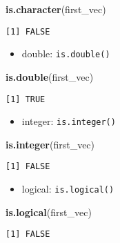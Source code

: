 \documentclass[
]{book}
\newenvironment{Shaded}{\begin{snugshade}}{\end{snugshade}}
\newcommand{\KeywordTok}[1]{\textcolor[rgb]{0.13,0.29,0.53}{\textbf{#1}}}
\newcommand{\NormalTok}[1]{#1}
\providecommand{\tightlist}{%
  \setlength{\itemsep}{0pt}\setlength{\parskip}{0pt}}
\begin{document}
\begin{Shaded}
\begin{Highlighting}[]
\KeywordTok{is.character}\NormalTok{(first_vec)}
\end{Highlighting}
\end{Shaded}

\begin{verbatim}
[1] FALSE
\end{verbatim}

\begin{itemize}
\tightlist
\item
  double: \texttt{is.double()}
\end{itemize}

\begin{Shaded}
\begin{Highlighting}[]
\KeywordTok{is.double}\NormalTok{(first_vec)}
\end{Highlighting}
\end{Shaded}

\begin{verbatim}
[1] TRUE
\end{verbatim}

\begin{itemize}
\tightlist
\item
  integer: \texttt{is.integer()}
\end{itemize}

\begin{Shaded}
\begin{Highlighting}[]
\KeywordTok{is.integer}\NormalTok{(first_vec)}
\end{Highlighting}
\end{Shaded}

\begin{verbatim}
[1] FALSE
\end{verbatim}

\begin{itemize}
\tightlist
\item
  logical: \texttt{is.logical()}
\end{itemize}

\begin{Shaded}
\begin{Highlighting}[]
\KeywordTok{is.logical}\NormalTok{(first_vec)}
\end{Highlighting}
\end{Shaded}

\begin{verbatim}
[1] FALSE
\end{verbatim}
\end{document}
